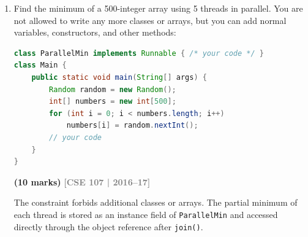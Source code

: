 \documentclass[12pt,a3paper]{article}
\newcommand{\yr}[1]{\hfill\textcolor{gray}{\small\textbf{[#1]}}}
\newcommand{\mk}[1]{\textcolor{orange!70!black}{\small\textbf{(#1 marks)}}}
\begin{document}
\begin{enumerate}
\begin{tcolorbox}[enhanced,breakable,ansbox,
  colback=cF!4,colframe=cF,boxrule=0.8pt,arc=5pt,
  title={\textbf{Answer — Two Ways to Create a Thread in Java}},
  fonttitle=\bfseries\color{white},colbacktitle=cF]
\begin{enumerate}[label=\textbf{\arabic*.}]
  \item \textbf{Single Inheritance constraint:} Java does not support
    multiple inheritance.  If a class already extends another class,
    it \emph{cannot} also extend \texttt{Thread}.  Implementing
    \texttt{Runnable} imposes no such restriction.
  \item \textbf{Separation of concerns:} \texttt{Runnable} separates
    the task logic from the thread mechanism, making code more modular
    and reusable.
  \item \textbf{Resource efficiency:} The same \texttt{Runnable}
    object can be submitted to thread pools (e.g.\
    \texttt{ExecutorService}), whereas a \texttt{Thread} subclass
    cannot be reused after termination.
  \item \textbf{Better OOP design:} Extending \texttt{Thread} is
    appropriate only when you need to modify the threading behaviour
    itself, which is rarely required in practice.
\end{enumerate}

\end{tcolorbox}

\item Find the minimum of a 500-integer array using 5 threads in parallel. You are not allowed to write any more classes or arrays, but you can add normal variables, constructors, and other methods:
\begin{lstlisting}[language=Java]
class ParallelMin implements Runnable { /* your code */ }
class Main {
    public static void main(String[] args) {
        Random random = new Random();
        int[] numbers = new int[500];
        for (int i = 0; i < numbers.length; i++)
            numbers[i] = random.nextInt();
        // your code
    }
}
\end{lstlisting}
\mk{10}
\yr{CSE 107 | 2016--17}

\begin{tcolorbox}[enhanced,breakable,ansbox,
  colback=cF!4,colframe=cF,boxrule=0.8pt,arc=5pt,
  title={\textbf{Answer --- Parallel Minimum of 500-Element Array (No Extra Arrays)}},
  fonttitle=\bfseries\color{white},colbacktitle=cF]

The constraint forbids additional classes or arrays.  The partial
minimum of each thread is stored as an instance field of
\texttt{ParallelMin} and accessed directly through the object
reference after \texttt{join()}.


\end{tcolorbox}
\end{enumerate}
\end{document}
